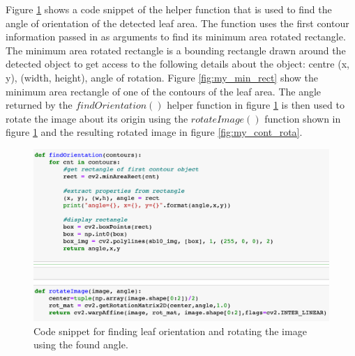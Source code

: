 Figure \ref{fig:my_find_orien_rotate} shows a code snippet of the helper function that is used to find the angle of orientation of the detected leaf area. The function uses the first contour information passed in as arguments to find its minimum area rotated rectangle. The minimum area rotated rectangle is a bounding rectangle drawn around the detected object to get access to the following details about the object: centre (x, y), (width, height), angle of rotation. Figure \ref{fig:my_min_rect} show the minimum area rectangle of one of the contours of the leaf area. The angle returned by the $findOrientation()$ helper function in figure \ref{fig:my_find_orien_rotate} is then used to rotate the image about its origin using the $rotateImage()$ function shown in figure \ref{fig:my_find_orien_rotate} and the resulting rotated image in figure \ref{fig:my_cont_rota}.


\begin{figure}[!htb]
    \centering
    \includegraphics[scale=0.65, keepaspectratio]{Figures/find_orien_rotate.png}
    \caption{Code snippet for finding leaf orientation and rotating the image using the found angle.}
    \label{fig:my_find_orien_rotate}
\end{figure} 



